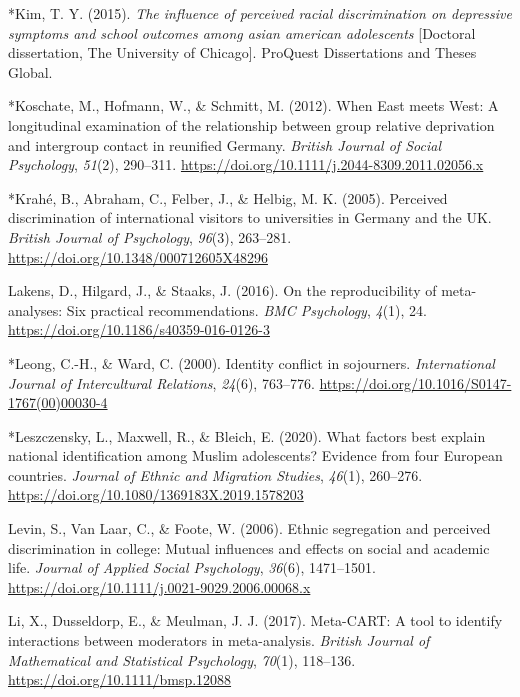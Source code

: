 \documentclass[12pt, letterpaper]{article}
\newenvironment{CSLReferences}[2]{}{}
\begin{document}
\begin{CSLReferences}{1}{0}
\leavevmode\hypertarget{ref-830}{}%
*Kim, T. Y. (2015). \emph{The influence of perceived racial
discrimination on depressive symptoms and school outcomes among asian
american adolescents} {[}Doctoral dissertation, The University of
Chicago{]}. {ProQuest Dissertations and Theses Global}.

\leavevmode\hypertarget{ref-401}{}%
*Koschate, M., Hofmann, W., \& Schmitt, M. (2012). When {East} meets
{West}: {A} longitudinal examination of the relationship between group
relative deprivation and intergroup contact in reunified {Germany}.
\emph{British Journal of Social Psychology}, \emph{51}(2), 290--311.
\url{https://doi.org/10.1111/j.2044-8309.2011.02056.x}

\leavevmode\hypertarget{ref-45}{}%
*Krahé, B., Abraham, C., Felber, J., \& Helbig, M. K. (2005). Perceived
discrimination of international visitors to universities in {Germany}
and the {UK}. \emph{British Journal of Psychology}, \emph{96}(3),
263--281. \url{https://doi.org/10.1348/000712605X48296}

\leavevmode\hypertarget{ref-lakens_reproducibility_2016}{}%
Lakens, D., Hilgard, J., \& Staaks, J. (2016). On the reproducibility of
meta-analyses: Six practical recommendations. \emph{BMC Psychology},
\emph{4}(1), 24. \url{https://doi.org/10.1186/s40359-016-0126-3}

\leavevmode\hypertarget{ref-1993}{}%
*Leong, C.-H., \& Ward, C. (2000). Identity conflict in sojourners.
\emph{International Journal of Intercultural Relations}, \emph{24}(6),
763--776. \url{https://doi.org/10.1016/S0147-1767(00)00030-4}

\leavevmode\hypertarget{ref-3134}{}%
*Leszczensky, L., Maxwell, R., \& Bleich, E. (2020). What factors best
explain national identification among {Muslim} adolescents? {Evidence}
from four {European} countries. \emph{Journal of Ethnic and Migration
Studies}, \emph{46}(1), 260--276.
\url{https://doi.org/10.1080/1369183X.2019.1578203}

\leavevmode\hypertarget{ref-levin_ethnic_2006}{}%
Levin, S., Van Laar, C., \& Foote, W. (2006). Ethnic segregation and
perceived discrimination in college: {Mutual} influences and effects on
social and academic life. \emph{Journal of Applied Social Psychology},
\emph{36}(6), 1471--1501.
\url{https://doi.org/10.1111/j.0021-9029.2006.00068.x}

\leavevmode\hypertarget{ref-li_meta-cart_2017}{}%
Li, X., Dusseldorp, E., \& Meulman, J. J. (2017). Meta-{CART}: {A} tool
to identify interactions between moderators in meta-analysis.
\emph{British Journal of Mathematical and Statistical Psychology},
\emph{70}(1), 118--136. \url{https://doi.org/10.1111/bmsp.12088}


\end{CSLReferences}
\end{document}
